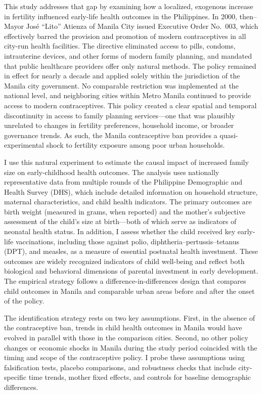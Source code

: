 \documentclass[]{AEA}
\begin{document}
This study addresses that gap by examining how a localized, exogenous
increase in fertility influenced early-life health outcomes in the
Philippines. In 2000, then--Mayor José ``Lito'' Atienza of Manila City
issued Executive Order No.~003, which effectively barred the provision
and promotion of modern contraceptives in all city-run health
facilities. The directive eliminated access to pills, condoms,
intrauterine devices, and other forms of modern family planning, and
mandated that public healthcare providers offer only natural methods.
The policy remained in effect for nearly a decade and applied solely
within the jurisdiction of the Manila city government. No comparable
restriction was implemented at the national level, and neighboring
cities within Metro Manila continued to provide access to modern
contraceptives. This policy created a clear spatial and temporal
discontinuity in access to family planning services---one that was
plausibly unrelated to changes in fertility preferences, household
income, or broader governance trends. As such, the Manila contraceptive
ban provides a quasi-experimental shock to fertility exposure among poor
urban households.

I use this natural experiment to estimate the causal impact of increased
family size on early-childhood health outcomes. The analysis uses
nationally representative data from multiple rounds of the Philippine
Demographic and Health Survey (DHS), which include detailed information
on household structure, maternal characteristics, and child health
indicators. The primary outcomes are birth weight (measured in grams,
when reported) and the mother's subjective assessment of the child's
size at birth---both of which serve as indicators of neonatal health
status. In addition, I assess whether the child received key early-life
vaccinations, including those against polio,
diphtheria--pertussis--tetanus (DPT), and measles, as a measure of
essential postnatal health investment. These outcomes are widely
recognized indicators of child well-being and reflect both biological
and behavioral dimensions of parental investment in early development.
The empirical strategy follows a difference-in-differences design that
compares child outcomes in Manila and comparable urban areas before and
after the onset of the policy.

The identification strategy rests on two key assumptions. First, in the
absence of the contraceptive ban, trends in child health outcomes in
Manila would have evolved in parallel with those in the comparison
cities. Second, no other policy changes or economic shocks in Manila
during the study period coincided with the timing and scope of the
contraceptive policy. I probe these assumptions using falsification
tests, placebo comparisons, and robustness checks that include
city-specific time trends, mother fixed effects, and controls for
baseline demographic differences.
\end{document}
